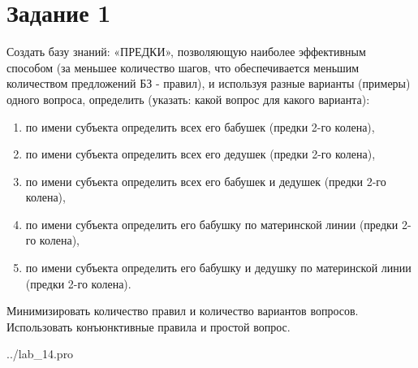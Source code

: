 \section*{Задание 1}
Создать базу знаний: «ПРЕДКИ», позволяющую наиболее эффективным способом (за меньшее количество шагов, что обеспечивается меньшим количеством предложений БЗ - правил), и используя разные варианты (примеры) одного вопроса, определить (указать: какой вопрос для какого варианта):
\begin{enumerate}
	\item по имени субъекта определить всех его бабушек (предки 2-го колена),
	\item по имени субъекта определить всех его дедушек (предки 2-го колена),
	\item по имени субъекта определить всех его бабушек и дедушек (предки 2-го
	колена),
	\item по имени субъекта определить его бабушку по материнской линии (предки 2-го колена),
	\item по имени субъекта определить его бабушку и дедушку по материнской линии (предки 2-го колена).
\end{enumerate}
Минимизировать количество правил и количество вариантов вопросов. Использовать конъюнктивные правила и простой вопрос.

\begin{lstinputlisting}[label=third,caption=Решение задания №1, language=prolog, firstline=1, lastline=28]{../lab_14.pro}
\end{lstinputlisting}

